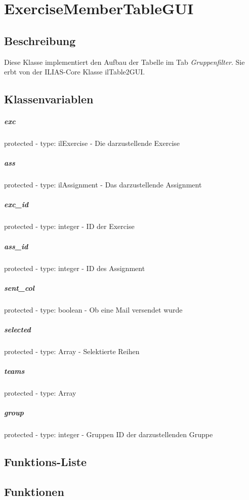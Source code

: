 \section{ExerciseMemberTableGUI}

\subsection*{Beschreibung}
Diese Klasse implementiert den Aufbau der Tabelle im Tab \textit{Gruppenfilter}. 
Sie erbt von der ILIAS-Core Klasse ilTable2GUI.

\subsection*{Klassenvariablen}
\subparagraph{exc}
protected - type: ilExercise - Die darzustellende Exercise
\subparagraph{ass}
protected - type: ilAssignment - Das darzustellende Assignment
\subparagraph{exc\_id}
protected - type: integer - ID der Exercise
\subparagraph{ass\_id}
protected - type: integer - ID des Assignment
\subparagraph{sent\_col}
protected - type: boolean - Ob eine Mail versendet wurde
\subparagraph{selected}
protected - type: Array - Selektierte Reihen
\subparagraph{teams}
protected - type: Array
\subparagraph{group}
protected - type: integer - Gruppen ID der darzustellenden Gruppe


\subsection*{Funktions-Liste}

\subparagraph{}
\subparagraph{}
\subparagraph{}
\subparagraph{}

\subsection*{Funktionen}

